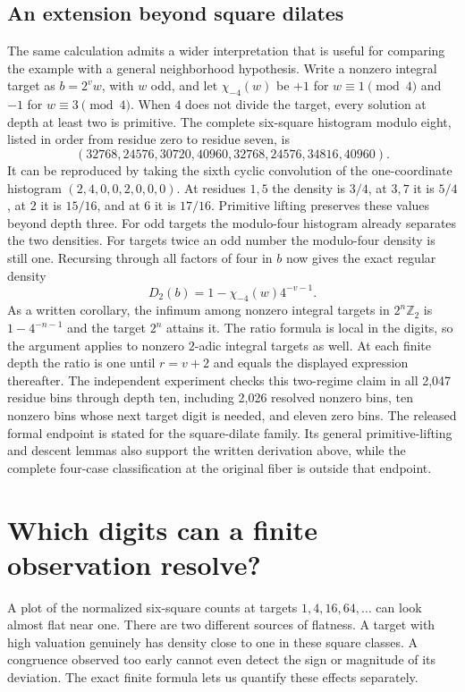 \documentclass[12pt,letterpaper]{article}
\begin{document}
\subsection{An extension beyond square dilates}
The same calculation admits a wider interpretation that is useful for comparing the example with a general neighborhood hypothesis. Write a nonzero integral target as $b=2^v w$, with $w$ odd, and let $\chi_{-4}(w)$ be $+1$ for $w\equiv1\pmod4$ and $-1$ for $w\equiv3\pmod4$. When $4$ does not divide the target, every solution at depth at least two is primitive. The complete six-square histogram modulo eight, listed in order from residue zero to residue seven, is
\[
 (32768,24576,30720,40960,32768,24576,34816,40960).
\]
It can be reproduced by taking the sixth cyclic convolution of the one-coordinate histogram $(2,4,0,0,2,0,0,0)$. At residues $1,5$ the density is $3/4$, at $3,7$ it is $5/4$, at $2$ it is $15/16$, and at $6$ it is $17/16$. Primitive lifting preserves these values beyond depth three. For odd targets the modulo-four histogram already separates the two densities. For targets twice an odd number the modulo-four density is still one. Recursing through all factors of four in $b$ now gives the exact regular density
\[
 D_2(b)=1-\chi_{-4}(w)4^{-v-1}.
\]
As a written corollary, the infimum among nonzero integral targets in $2^n\mathbb Z_2$ is $1-4^{-n-1}$ and the target $2^n$ attains it. The ratio formula is local in the digits, so the argument applies to nonzero $2$-adic integral targets as well. At each finite depth the ratio is one until $r=v+2$ and equals the displayed expression thereafter. The independent experiment checks this two-regime claim in all 2,047 residue bins through depth ten, including 2,026 resolved nonzero bins, ten nonzero bins whose next target digit is needed, and eleven zero bins. The released formal endpoint is stated for the square-dilate family. Its general primitive-lifting and descent lemmas also support the written derivation above, while the complete four-case classification at the original fiber is outside that endpoint.

\section{Which digits can a finite observation resolve?}\label{sec:precision}
A plot of the normalized six-square counts at targets $1,4,16,64,\ldots$ can look almost flat near one. There are two different sources of flatness. A target with high valuation genuinely has density close to one in these square classes. A congruence observed too early cannot even detect the sign or magnitude of its deviation. The exact finite formula lets us quantify these effects separately.
\end{document}

